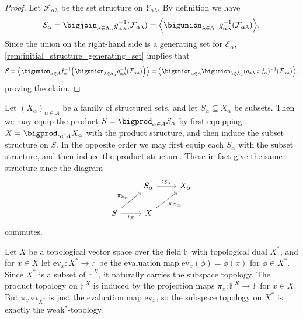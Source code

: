 \documentclass[article, a4paper, 11pt, oneside]{memoir}
\numberwithin{equation}{chapter}
\newcommand{\setF}{\mathbb{F}}
\newcommand{\ev}{\mathrm{ev}}
\newcommand{\calE}{\mathcal{E}}
\newcommand{\calF}{\mathcal{F}}
\DeclarePairedDelimiter{\gen}{\langle}{\rangle} %
\begin{document}
\begin{proof}
    Let $\calF_{\alpha\lambda}$ be the set structure on $Y_{\alpha\lambda}$. By definition we have
    \begin{equation*}
        \calE_\alpha
            = \bigjoin_{\lambda \in \Lambda_\alpha} g_{\alpha\lambda}^{-1}(\calF_{\alpha\lambda})
            = \gen[\Big]{\bigunion_{\lambda \in \Lambda_\alpha} g_{\alpha\lambda}^{-1}(\calF_{\alpha\lambda})}.
    \end{equation*}
    Since the union on the right-hand side is a generating set for $\calE_\alpha$, \cref{rem:initial_structure_generating_set} implies that
    \begin{equation*}
        \calE
            = \gen[\Big]{\bigunion_{\alpha \in A} f_\alpha^{-1} \Big( \bigunion_{\lambda \in \Lambda_\alpha} g_{\alpha\lambda}^{-1}(\calF_{\alpha\lambda}) \Big)}
            = \gen[\Big]{\bigunion_{\alpha \in A} \bigunion_{\lambda \in \Lambda_\alpha} (g_{\alpha\lambda} \circ f_\alpha)^{-1}(\calF_{\alpha\lambda})},
    \end{equation*}
    proving the claim.
\end{proof}


\begin{examplebreak}
    Let $(X_\alpha)_{\alpha \in A}$ be a family of structured sets, and let $S_\alpha \subseteq X_\alpha$ be subsets. Then we may equip the product $S = \bigprod_{\alpha \in A} S_\alpha$ by first equipping $X = \bigprod_{\alpha \in A} X_\alpha$ with the product structure, and then induce the subset structure on $S$. In the opposite order we may first equip each $S_\alpha$ with the subset structure, and then induce the product structure. These in fact give the same structure since the diagram
    \begin{equation*}
        \begin{tikzcd}
            & S_\alpha
                \ar[r, "\iota_{S_\alpha}"]
            & X_\alpha \\
            S  
                \ar[ur, "\pi_{S_\alpha}"]
                \ar[r, "\iota_S", swap]
            & X
                \ar[ur, "\pi_{X_\alpha}", swap]
        \end{tikzcd}
    \end{equation*}
    commutes.
\end{examplebreak}


\begin{examplebreak}
    Let $X$ be a topological vector space over the field $\setF$ with topological dual $X^*$, and for $x \in X$ let $\ev_x \colon X^* \to \setF$ be the evaluation map $\ev_x(\phi) = \phi(x)$ for $\phi \in X^*$. Since $X^*$ is a subset of $\setF^X$, it naturally carries the subspace topology. The product topology on $\setF^X$ is induced by the projection maps $\pi_x \colon \setF^X \to \setF$ for $x \in X$. But $\pi_x \circ \iota_{X^*}$ is just the evaluation map $\ev_x$, so the subspace topology on $X^*$ is exactly the weak${}^*$-topology.
\end{examplebreak}
\end{document}
